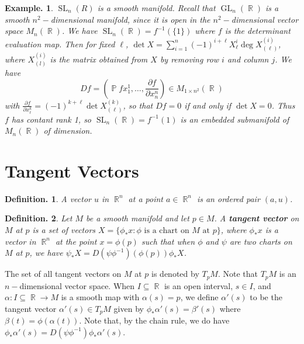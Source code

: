 \documentclass[11pt, a4paper]{memoir}
\DeclareMathOperator{\R}{{\mathbb{R}}}
\theoremstyle{change}
\theoremstyle{plain}
\theoremstyle{nonumberplain}
\newtheorem{definition}{Definition.}
\newtheorem{example}{Example.}
\DeclareMathOperator{\GL}{GL}
\DeclareMathOperator{\SL}{SL}
\DeclareMathOperator{\pr}{{\mathbb{P}}}
\newcommand{\prt}[2]{\ensuremath{\frac{\partial #1}{\partial #2}}}
\numberwithin{equation}{section}
\begin{document}
\begin{example}
    $\SL_n(R)$ is a smooth manifold.
    Recall that $\GL_n(\R)$ is a smooth $n^2-$dimensional manifold, since it is open in the $n^2-$dimensional vector space $M_n(\R)$.
    We have $\SL_n(\R)=f^{-1}(\{1\})$ where $f$ is the determinant evaluation map.
    Then for fixed $\ell$, $\det X=\sum_{i=1}^n(-1)^{i+\ell}X^i_\ell\deg X^{(i)}_{(\ell)}$, where $X^{(i)}_{(l)}$ is the matrix obtained from $X$ by removing row $i$ and column $j$.
    We have
    \begin{equation*}
        Df=\left(\pr{f}{x_1^1},\ldots,\prt{f}{x^n_n}\right)\in M_{1\times n^2}(\R)
    \end{equation*}
    with $\prt{f}{x^k_\ell}=(-1)^{k+\ell}\det X^{(k)}_{(\ell)}$, so that $Df=0$ if and only if $\det X=0$.
    Thus $f$ has contant rank 1, so $\SL_n(\R)=f^{-1}(1)$ is an embedded submanifold of $M_n(\R)$ of dimension.
\end{example}
\section{Tangent Vectors}
\begin{definition}
    A vector $u$ in $\R^n$ at a point $a\in\R^n$ is an ordered pair $(a,u)$.
\end{definition}
\begin{definition}
    Let $M$ be a smooth manifold and let $p\in M$.
    A \textbf{tangent vector} on $M$ at $p$ is a set of vectors $X=\{\phi_*x:\phi\text{ is a chart on $M$ at $p$}\}$, where $\phi_*x$ is a vector in $\R^n$ at the point $x=\phi(p)$ such that when $\phi$ and $\psi$ are two charts on $M$ at $p$, we have $\psi_*X=D(\psi\phi^{-1})(\phi(p))\phi_*X$.
\end{definition}
The set of all tangent vectors on $M$ at $p$ is denoted by $T_pM$.
Note that $T_pM$ is an $n-$dimensional vector space.
When $I\subseteq\R$ is an open interval, $s\in I$, and $\alpha:I\subseteq\R\to M$ is a smooth map with $\alpha(s)=p$, we define $\alpha'(s)$ to be the tangent vector $\alpha'(s)\in T_pM$ given by $\phi_*\alpha'(s)=\beta'(s)$ where $\beta(t)=\phi(\alpha(t))$.
Note that, by the chain rule, we do have $\phi_*\alpha'(s)=D(\psi\phi^{-1})\phi_*\alpha'(s)$.
\end{document}
